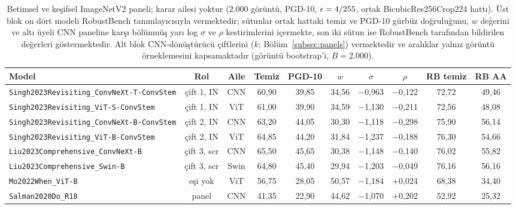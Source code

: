 \begin{table}[!t]
\centering
\caption{Betimsel ve keşifsel ImageNetV2 paneli; karar ailesi yoktur ($2.000$ görüntü, PGD-10, $\epsilon = 4/255$, ortak BicubicRes256Crop224 hattı). Üst blok on dört modeli RobustBench tanımlayıcısıyla vermektedir; sütunlar ortak hattaki temiz ve PGD-10 gürbüz doğruluğunu, $w$ değerini ve altı üyeli CNN paneline karşı bölünmüş yarı log $\sigma$ ve $\rho$ kestirimlerini içermekte, son iki sütun ise RobustBench tarafından bildirilen değerleri göstermektedir. Alt blok CNN-dönüştürücü çiftlerini ($k$; Bölüm~\ref{subsec:panels}) vermektedir ve aralıklar yalnız görüntü örneklemesini kapsamaktadır (görüntü bootstrap'i, $B = 2.000$).}
\label{tab:imagenet}
\scriptsize
\setlength{\tabcolsep}{2.5pt}
\begin{tabular*}{\textwidth}{@{\extracolsep{\fill}}lccccccccc}
\toprule
\textbf{Model} & \textbf{Rol} & \textbf{Aile} & \textbf{Temiz} & \textbf{PGD-10} & \textbf{$w$} & \textbf{$\sigma$} & \textbf{$\rho$} & \textbf{RB temiz} & \textbf{RB AA} \\
\midrule
\texttt{Singh2023Revisiting\_ConvNeXt-T-ConvStem} & çift 1, IN & CNN & 60,90 & 39,85 & 34,56 & $-$0,963 & $-$0,122 & 72,72 & 49,46 \\
\texttt{Singh2023Revisiting\_ViT-S-ConvStem} & çift 1, IN & ViT & 61,00 & 39,90 & 34,59 & $-$1,130 & $-$0,211 & 72,56 & 48,08 \\
\texttt{Singh2023Revisiting\_ConvNeXt-B-ConvStem} & çift 2, IN & CNN & 63,20 & 44,05 & 30,30 & $-$1,118 & $-$0,298 & 75,90 & 56,14 \\
\texttt{Singh2023Revisiting\_ViT-B-ConvStem} & çift 2, IN & ViT & 64,85 & 44,20 & 31,84 & $-$1,237 & $-$0,188 & 76,30 & 54,66 \\
\texttt{Liu2023Comprehensive\_ConvNeXt-B} & çift 3, scr & CNN & 65,50 & 45,65 & 30,38 & $-$1,148 & $-$0,140 & 76,02 & 55,82 \\
\texttt{Liu2023Comprehensive\_Swin-B} & çift 3, scr & Swin & 64,80 & 45,40 & 29,94 & $-$1,203 & $-$0,049 & 76,16 & 56,16 \\
\texttt{Mo2022When\_ViT-B} & eşi yok & ViT & 56,75 & 28,05 & 50,57 & $-$1,184 & $+$0,024 & 68,38 & 34,40 \\
\texttt{Salman2020Do\_R18} & panel & CNN & 41,35 & 22,90 & 44,62 & $-$1,070 & $+$0,202 & 52,92 & 25,32 \\

\end{tabular*}
\end{table}
